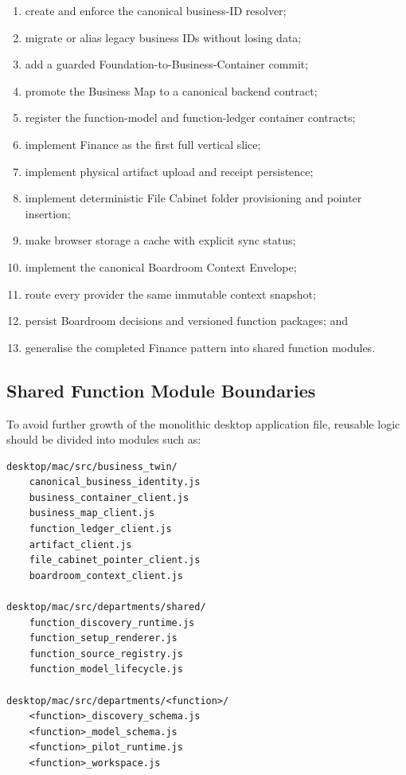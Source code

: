 \begin{enumerate}
  \item create and enforce the canonical business-ID resolver;
  \item migrate or alias legacy business IDs without losing data;
  \item add a guarded Foundation-to-Business-Container commit;
  \item promote the Business Map to a canonical backend contract;
  \item register the function-model and function-ledger container contracts;
  \item implement Finance as the first full vertical slice;
  \item implement physical artifact upload and receipt persistence;
  \item implement deterministic File Cabinet folder provisioning and pointer
  insertion;
  \item make browser storage a cache with explicit sync status;
  \item implement the canonical Boardroom Context Envelope;
  \item route every provider the same immutable context snapshot;
  \item persist Boardroom decisions and versioned function packages; and
  \item generalise the completed Finance pattern into shared function modules.
\end{enumerate}

\subsection{Shared Function Module Boundaries}

To avoid further growth of the monolithic desktop application file, reusable
logic should be divided into modules such as:

\begin{verbatim}
desktop/mac/src/business_twin/
    canonical_business_identity.js
    business_container_client.js
    business_map_client.js
    function_ledger_client.js
    artifact_client.js
    file_cabinet_pointer_client.js
    boardroom_context_client.js

desktop/mac/src/departments/shared/
    function_discovery_runtime.js
    function_setup_renderer.js
    function_source_registry.js
    function_model_lifecycle.js

desktop/mac/src/departments/<function>/
    <function>_discovery_schema.js
    <function>_model_schema.js
    <function>_pilot_runtime.js
    <function>_workspace.js
\end{verbatim}

